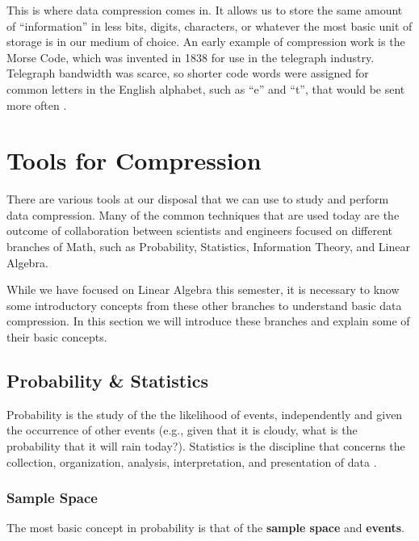 \documentclass[12pt]{report}
\begin{document}
        This is where data compression comes in. It allows us to store the same amount of ``information'' in less bits, digits, characters, or whatever the most basic unit of storage is in our medium of choice. An early example of compression work is the Morse Code, which was invented in 1838 for use in the telegraph industry. Telegraph bandwidth was scarce, so shorter code words were assigned for common letters in the English alphabet, such as ``e'' and ``t'', that would be sent more often \cite{Wolfram2002}.
    
    \chapter{Tools for Compression}
        There are various tools at our disposal that we can use to study and perform data compression. Many of the common techniques that are used today are the outcome of collaboration between scientists and engineers focused on different branches of Math, such as Probability, Statistics, Information Theory, and Linear Algebra.
        
        While we have focused on Linear Algebra this semester, it is necessary to know some introductory concepts from these other branches to understand basic data compression. In this section we will introduce these branches and explain some of their basic concepts.
        
        \section{Probability \& Statistics}
            Probability is the study of the the likelihood of events, independently and given the occurrence of other events (e.g., given that it is cloudy, what is the probability that it will rain today?). Statistics is the discipline that concerns the collection, organization, analysis, interpretation, and presentation of data \cite{wiki:Statistics}.

            \subsection{Sample Space}
                The most basic concept in probability is that of the \textbf{sample space} and \textbf{events}.
                
\end{document}
